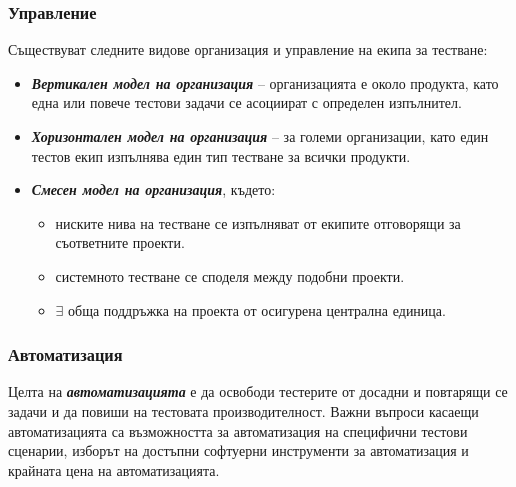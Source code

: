\documentclass[fleqn,12pt]{article}
\begin{document}
\subsubsection{Управление}
Съществуват следните видове организация и управление на екипа за тестване:
\begin{itemize}
    \item \textbf{\textit{Вертикален модел на организация}} -- организацията е около продукта, като една или повече тестови задачи се асоциират с определен изпълнител.
    \item \textbf{\textit{Хоризонтален модел на организация}} -- за големи организации, като един тестов екип изпълнява един тип тестване за всички продукти.
    \item \textbf{\textit{Смесен модел на организация}}, където:
    \begin{itemize}
        \item ниските нива на тестване се изпълняват от екипите отговорящи за съответните проекти.
        \item системното тестване се споделя между подобни проекти.
        \item $\exists$ обща поддръжка на проекта от осигурена централна единица.
    \end{itemize}
\end{itemize}

\subsubsection{Автоматизация}

Целта на \textbf{\textit{автоматизацията}} е да освободи тестерите от досадни и повтарящи се задачи и да повиши на тестовата производителност.
Важни въпроси касаещи автоматизацията са възможността за автоматизация на специфични тестови сценарии, изборът на достъпни софтуерни инструменти за автоматизация и крайната цена на автоматизацията.
\end{document}
